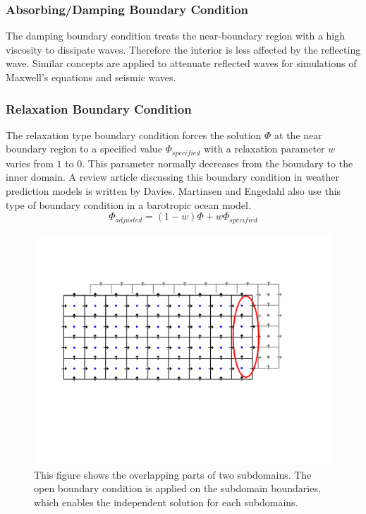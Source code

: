 \subsubsection*{\normalsize{Absorbing/Damping Boundary Condition}}
The damping boundary condition \cite{Kosloff1986} treats the
near-boundary region with a high viscosity to dissipate waves. Therefore the interior is less affected by the reflecting wave. Similar concepts  \cite{Petropoulos1998, Shin1995} are applied to attenuate reflected waves for simulations of Maxwell's equations and seismic waves.
\subsubsection*{\normalsize{Relaxation Boundary Condition}}
The relaxation type boundary condition forces the solution $\Phi$ at the near boundary region to a specified value $\Phi_{specified}$ with a relaxation parameter $w$ varies from $1$ to $0$. This parameter normally decreases from the boundary to the inner domain. A review article discussing this boundary condition in weather prediction models is written by Davies\cite{Davies1983}. Martinsen and Engedahl \cite{Martinsen1987} also use this type of boundary condition in a barotropic ocean model.
\begin{equation}
\Phi_{adjusted} = (1-w)\Phi + w\Phi_{specified}
\end{equation}


\begin{figure}[h]
  \begin{center}
\includegraphics[scale=0.4]{../figures/RBM-step1.pdf}
   \caption{This figure shows the overlapping parts of two subdomains. The open boundary condition is applied on the subdomain boundaries, which enables the independent solution for each subdomains.}
    \label{fig:RBM-step1}
  \end{center}
\end{figure}

